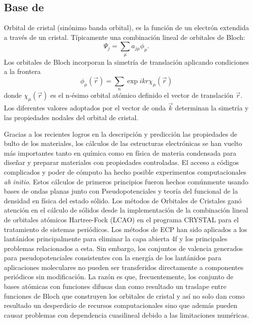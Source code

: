 \subsection*{Base de \cite{Yang2005}}
Orbital de cristal (sin\'onimo banda orbital), es la funci\'on de un
electr\'on extendida a trav\'es de un cristal. T\'ipicamente una 
combinaci\'on lineal de orbitales de Bloch:
$$\Psi_j=\sum_{\mu}a_{j\mu}\phi_{\mu}.$$
Los orbitales de Bloch incorporan la simetr\'ia de translaci\'on
aplicando condiciones a la frontera
$$\phi_{\mu}(\vec r)=\sum_n\exp{ikr}\chi_{\mu}(\vec r)$$
donde $\chi_{\mu}(\vec r)$ es el n-\'esimo orbital at\'omico definido 
el vector de translaci\'on $\vec r$. Los diferentes valores adoptados
por el vector de onda $\vec k$ determinan la simetr\'ia y las 
propiedades nodales del orbital de cristal.

Gracias a los recientes logros en la descripci\'on y predicci\'on las
propiedades de bulto de los materiales, los c\'alculos de las 
estructuras electr\'onicas se han vuelto m\'as importantes tanto en
qu\'imica como en f\'isica de materia condensada para dise\~nar y 
preparar materiales con propiedades controladas. El acceso a 
c\'odigos complicados y poder de c\'omputo ha hecho posible 
experimentos computacionales {\it ab initio}. Estos c\'alculos de 
primeros principios fueron hechos com\'unmente usando bases de ondas 
planas junto con Pseudopotenciales y teor\'ia del funcional de la 
densidad en f\'isica del estado s\'olido. Los m\'etodos de Orbitales 
de Cristales gan\'o atenci\'on en el c\'alculo de s\'olidos desde la
implementaci\'on de la combinaci\'on lineal de orbitales at\'omicos 
Hartree-Fock (LCAO) en el programa CRYSTAL para el tratamiento de 
sistemas peri\'odicos. Los m\'etodos de ECP han sido aplicados a los 
lant\'anidos principalmente para eliminar la capa abierta 4f y los
principales problemas relacionados a esta. %
Sin embargo, los conjuntos de valencia generados para pseudopotenciales 
consistentes con la energ\'ia de los lant\'anidos para aplicaciones
moleculares no pueden ser transferidos directamente a componentes 
peri\'odicos sin modificaci\'on. La raz\'on es que, frecuentemente,
los conjunto de bases at\'omicas con funciones difusas dan como 
resultado un traslape entre funciones de Bloch que construyen los 
orbitales de cristal y as\'i no solo dan como resultado un 
desperdicio de recursos computacionales sino que adem\'as pueden 
causar problemas con dependencia cuasilineal debido a las 
limitaciones num\'ericas. 

